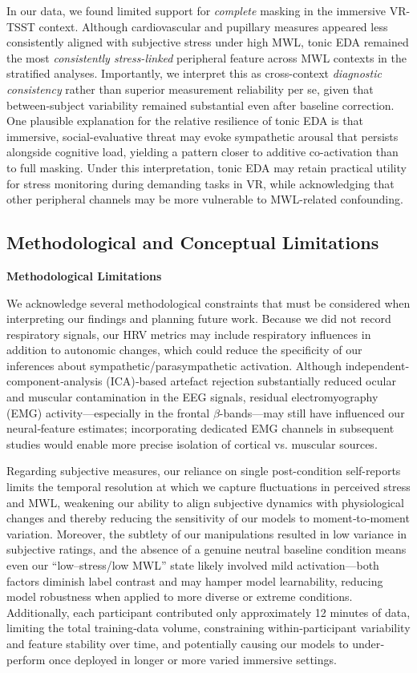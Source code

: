 \documentclass[lettersize,journal]{IEEEtran}
\begin{document}
In our data, we found limited support for \emph{complete} masking in the immersive VR-TSST context. Although cardiovascular and pupillary measures appeared less consistently aligned with subjective stress under high MWL, tonic EDA remained the most \emph{consistently stress-linked} peripheral feature across MWL contexts in the stratified analyses. Importantly, we interpret this as cross-context \emph{diagnostic consistency} rather than superior measurement reliability per se, given that between-subject variability remained substantial even after baseline correction. One plausible explanation for the relative resilience of tonic EDA is that immersive, social-evaluative threat may evoke sympathetic arousal that persists alongside cognitive load, yielding a pattern closer to additive co-activation than to full masking. Under this interpretation, tonic EDA may retain practical utility for stress monitoring during demanding tasks in VR, while acknowledging that other peripheral channels may be more vulnerable to MWL-related confounding.

\subsection{Methodological and Conceptual Limitations}

\textbf{Methodological Limitations}

We acknowledge several methodological constraints that must be considered when interpreting our findings and planning future work. Because we did not record respiratory signals, our HRV metrics may include respiratory influences in addition to autonomic changes, which could reduce the specificity of our inferences about sympathetic/parasympathetic activation. Although independent‐component‐analysis (ICA)‐based artefact rejection substantially reduced ocular and muscular contamination in the EEG signals, residual electromyography (EMG) activity—especially in the frontal \(\beta\)-bands—may still have influenced our neural‐feature estimates; incorporating dedicated EMG channels in subsequent studies would enable more precise isolation of cortical vs. muscular sources. 

Regarding subjective measures, our reliance on single post-condition self-reports limits the temporal resolution at which we capture fluctuations in perceived stress and MWL, weakening our ability to align subjective dynamics with physiological changes and thereby reducing the sensitivity of our models to moment‐to‐moment variation. Moreover, the subtlety of our manipulations resulted in low variance in subjective ratings, and the absence of a genuine neutral baseline condition means even our “low–stress/low MWL” state likely involved mild activation—both factors diminish label contrast and may hamper model learnability, reducing model robustness when applied to more diverse or extreme conditions.  Additionally, each participant contributed only approximately 12 minutes of data, limiting the total training‐data volume, constraining within‐participant variability and feature stability over time, and potentially causing our models to under‐perform once deployed in longer or more varied immersive settings.
\end{document}
